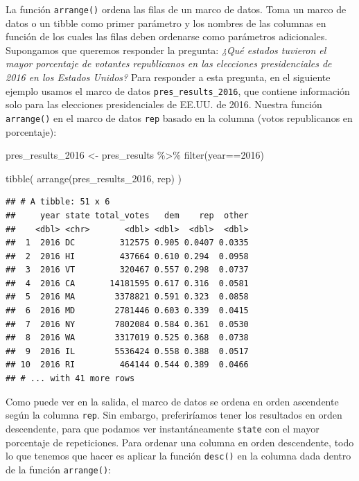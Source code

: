\documentclass[
]{book}
\newenvironment{Shaded}{\begin{snugshade}}{\end{snugshade}}
\newcommand{\DecValTok}[1]{\textcolor[rgb]{0.00,0.00,0.81}{#1}}
\newcommand{\FunctionTok}[1]{\textcolor[rgb]{0.00,0.00,0.00}{#1}}
\newcommand{\NormalTok}[1]{#1}
\newcommand{\OtherTok}[1]{\textcolor[rgb]{0.56,0.35,0.01}{#1}}
\newcommand{\SpecialCharTok}[1]{\textcolor[rgb]{0.00,0.00,0.00}{#1}}
\begin{document}
La función \texttt{arrange()} ordena las filas de un marco de datos. Toma un marco de datos o un tibble como primer parámetro y los nombres de las columnas en función de los cuales las filas deben ordenarse como parámetros adicionales. Supongamos que queremos responder la pregunta: \emph{¿Qué estados tuvieron el mayor porcentaje de votantes republicanos en las elecciones presidenciales de 2016 en los Estados Unidos?} Para responder a esta pregunta, en el siguiente ejemplo usamos el marco de datos \texttt{pres\_results\_2016}, que contiene información solo para las elecciones presidenciales de EE.UU. de 2016. Nuestra función \texttt{arrange()} en el marco de datos \texttt{rep} basado en la columna (votos republicanos en porcentaje):

\begin{Shaded}
\begin{Highlighting}[]
\NormalTok{pres\_results\_2016 }\OtherTok{\textless{}{-}}\NormalTok{ pres\_results }\SpecialCharTok{\%\textgreater{}\%}
  \FunctionTok{filter}\NormalTok{(year}\SpecialCharTok{==}\DecValTok{2016}\NormalTok{)}
\end{Highlighting}
\end{Shaded}

\begin{Shaded}
\begin{Highlighting}[]
\FunctionTok{tibble}\NormalTok{(}
\FunctionTok{arrange}\NormalTok{(pres\_results\_2016, rep)}
\NormalTok{)}
\end{Highlighting}
\end{Shaded}

\begin{verbatim}
## # A tibble: 51 x 6
##     year state total_votes   dem    rep  other
##    <dbl> <chr>       <dbl> <dbl>  <dbl>  <dbl>
##  1  2016 DC         312575 0.905 0.0407 0.0335
##  2  2016 HI         437664 0.610 0.294  0.0958
##  3  2016 VT         320467 0.557 0.298  0.0737
##  4  2016 CA       14181595 0.617 0.316  0.0581
##  5  2016 MA        3378821 0.591 0.323  0.0858
##  6  2016 MD        2781446 0.603 0.339  0.0415
##  7  2016 NY        7802084 0.584 0.361  0.0530
##  8  2016 WA        3317019 0.525 0.368  0.0738
##  9  2016 IL        5536424 0.558 0.388  0.0517
## 10  2016 RI         464144 0.544 0.389  0.0466
## # ... with 41 more rows
\end{verbatim}

Como puede ver en la salida, el marco de datos se ordena en orden ascendente según la columna \texttt{rep}. Sin embargo, preferiríamos tener los resultados en orden descendente, para que podamos ver instantáneamente \texttt{state} con el mayor porcentaje de repeticiones. Para ordenar una columna en orden descendente, todo lo que tenemos que hacer es aplicar la función \texttt{desc()} en la columna dada dentro de la función \texttt{arrange()}:
\end{document}
